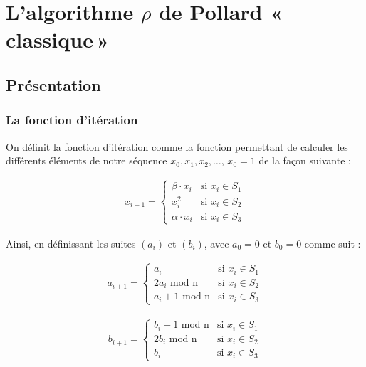 \chapter{L'algorithme \texorpdfstring{$\rho$}{Rho} de Pollard «\texorpdfstring{\,}{\ }classique\texorpdfstring{\,}{\ }»}
    \section{Présentation}

        \subsection{La fonction d'itération}
        On définit la fonction d'itération comme la fonction permettant de calculer les différents éléments de notre séquence $x_0, x_1, x_2, \ldots$, $x_0 = 1$ de la façon suivante :

        \begin{align*}
          x_{i+1} =
          \begin{cases}
            \beta \cdot x_i & \text{si } x_i \in S_1 \\
            x_i^2 & \text{si } x_i \in S_2 \\
            \alpha \cdot x_i & \text{si } x_i \in S_3
          \end{cases}
        \end{align*}

        Ainsi, en définissant les suites $(a_i)$ et $(b_i)$, avec $a_0 = 0$ et $b_0 = 0$ comme suit :

        \begin{align*}
          a_{i+1} =
          \begin{cases}
            a_i                   & \text{si } x_i \in S_1 \\
            2a_i \text{ mod n}    & \text{si } x_i \in S_2 \\
            a_i + 1 \text{ mod n} & \text{si } x_i \in S_3
          \end{cases}
        \end{align*}

        \begin{align*}
          b_{i+1} =
          \begin{cases}
            b_i + 1 \text{ mod n} & \text{si } x_i \in S_1 \\
            2b_i \text{ mod n}    & \text{si } x_i \in S_2 \\
            b_i                   & \text{si } x_i \in S_3
          \end{cases}
        \end{align*}


